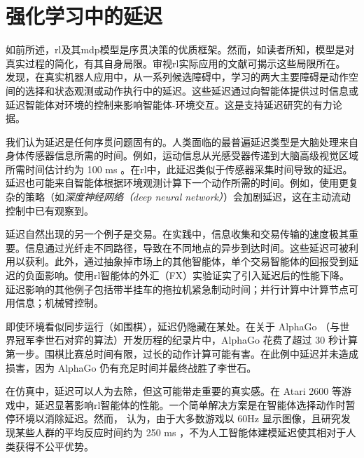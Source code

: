 \section{强化学习中的延迟}
\label{sec:why_delay_ns}

如前所述，\gls{rl}及其\gls{mdp}模型是序贯决策的优质框架。然而，如读者所知，模型是对真实过程的简化，有其自身局限。审视\gls{rl}实际应用的文献可揭示这些局限所在。\cite{mahmood2018setting} 发现，在真实机器人应用中，从一系列候选障碍中，学习的两大主要障碍是动作空间的选择和状态观测或动作执行中的延迟。这些延迟通过向智能体提供过时信息或延迟智能体对环境的控制来影响智能体-环境交互。这是支持延迟研究的有力论据。

我们认为延迟是任何序贯问题固有的。人类面临的最普遍延迟类型是大脑处理来自身体传感器信息所需的时间。例如，运动信息从光感受器传递到大脑高级视觉区域所需时间估计约为 100 ms \cite{de1991vernier}。在\gls{rl}中，此延迟类似于传感器采集时间导致的延迟。延迟也可能来自智能体根据环境观测计算下一个动作所需的时间。例如，使用更复杂的策略（如\emph{深度神经网络（deep neural network）}）会加剧延迟，这在主动流动控制中已有观察到\cite{ren2021applying,mao2022active}。

延迟自然出现的另一个例子是交易。在实践中，信息收集和交易传输的速度极其重要。信息通过光纤走不同路径，导致在不同地点的异步到达时间。这些延迟可被利用以获利\cite{lewis2014flash}。此外，通过抽象掉市场上的其他智能体，单个交易智能体的回报受到延迟的负面影响\cite{wilcox1993effect}。使用\gls{rl}智能体的外汇（FX）实验证实了引入延迟后的性能下降\cite{liotet2022delayed}。延迟影响的其他例子包括带半挂车的拖拉机紧急制动时间\cite{bayan2010brake}；并行计算中计算节点可用信息\cite{hannah2018unbounded}；机械臂控制\cite{mahmood2018setting}。

即使环境看似同步运行（如围棋），延迟仍隐藏在某处。在关于 AlphaGo \cite{silver2016mastering}（与世界冠军李世石对弈的算法）开发历程的纪录片中，AlphaGo 花费了超过 30 秒计算第一步。围棋比赛总时间有限，过长的动作计算可能有害。在此例中延迟并未造成损害，因为 AlphaGo 仍有充足时间并最终战胜了李世石。

在仿真中，延迟可以人为去除，但这可能带走重要的真实感。在 Atari 2600 等游戏中，延迟显著影响\gls{rl}智能体的性能\cite{firoiu2018human}。一个简单解决方案是在智能体选择动作时暂停环境以消除延迟。然而，\cite{firoiu2018human} 认为，由于大多数游戏以 60Hz 显示图像，且研究发现某些人群的平均反应时间约为 250 ms \cite{jain2015comparative}，不为人工智能体建模延迟使其相对于人类获得不公平优势。

